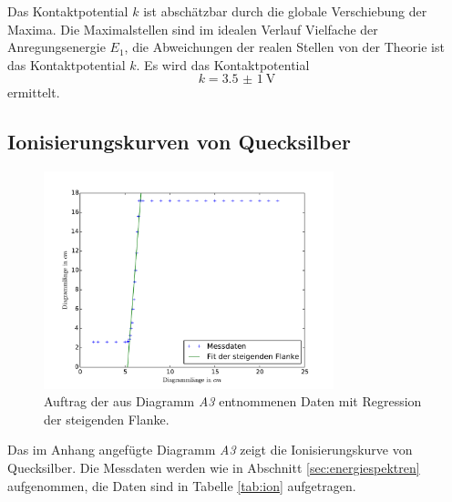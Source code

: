 Das Kontaktpotential $k$ ist abschätzbar durch die globale Verschiebung der Maxima.
Die Maximalstellen sind im idealen Verlauf Vielfache der Anregungsenergie $E_1$, 
die Abweichungen der realen Stellen von der Theorie ist das Kontaktpotential $k$.
Es wird das Kontaktpotential
\begin{equation}
	k=\SI{3.5(10)}{\volt}
	\label{qu:k2}
\end{equation}
ermittelt.

\subsection{Ionisierungskurven von Quecksilber} %
\label{sec:ion}
\begin{figure}
	\centering
	\includegraphics[width=0.75\textwidth]{Bilder/Vert_ion.pdf}
	\caption{Auftrag der aus Diagramm \emph{A3} entnommenen Daten mit Regression der steigenden Flanke. \cite{matplotlib}}
	\label{fig:ion}
\end{figure}
Das im Anhang angefügte Diagramm \emph{A3} zeigt die Ionisierungskurve von Quecksilber.
Die Messdaten werden wie in Abschnitt \ref{sec:energiespektren} aufgenommen, 
die Daten sind in Tabelle \ref{tab:ion} aufgetragen.
